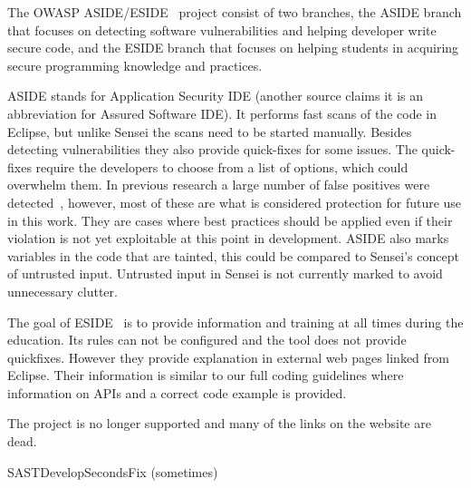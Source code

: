 
{
\label{bc:ASIDE}
The OWASP ASIDE/ESIDE~\cite{aside} project consist of two branches, the ASIDE branch that focuses on detecting software vulnerabilities and helping developer write secure code, and the ESIDE branch that focuses on helping students in acquiring secure programming knowledge and practices.

ASIDE stands for Application Security IDE (another source claims it is an abbreviation for Assured Software IDE). It performs fast scans of the code in Eclipse, but unlike Sensei the scans need to be started manually.
Besides detecting vulnerabilities they also provide quick-fixes for some issues. 
The quick-fixes require the developers to choose from a list of options, which could overwhelm them.
In previous research a large number of false positives were detected~\cite{xie2011aside}, however, most of these are what is considered protection for future use in this work.
They are cases where best practices should be applied even if their violation is not yet exploitable at this point in development.
ASIDE also marks variables in the code that are tainted, this could be compared to Sensei's concept of untrusted input.
Untrusted input in Sensei is not currently marked to avoid unnecessary clutter. 

The goal of ESIDE~\cite{eside,whitney2018embedding} is to provide information and training at all times during the education. Its rules can not be configured and the tool does not provide quickfixes. However they provide explanation in external web pages linked from Eclipse. Their information is similar to our full coding guidelines where information on APIs and a correct code example is provided.

The project is no longer supported and many of the links on the website are dead.
}{SAST}{Develop}{Seconds}{Fix (sometimes)}

